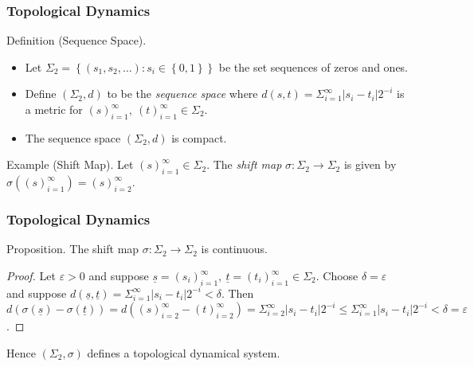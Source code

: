 \documentclass{beamer}
\begin{document}
\begin{frame}
    \frametitle{Topological Dynamics}
    \begin{block}{Definition (Sequence Space).}
        \begin{itemize}
            \item Let $\Sigma_2 = \left\lbrace (s_1, s_2, \dots): s_i \in \left\lbrace 0, 1 \right\rbrace \right\rbrace$ be the set sequences of zeros and ones.
            \item Define $(\Sigma_2, d)$ to be the \emph{sequence space} where $d(s, t) = \Sigma_{i=1}^{\infty}|s_i - t_i|2^{-i}$ is a metric for $(s)_{i=1}^{\infty}, \ (t)_{i=1}^{\infty}  \in \Sigma_2$.
            \item The sequence space $(\Sigma_2, d)$ is compact.
        \end{itemize}
    \end{block}
    \vspace{0.5cm}
    \begin{block}{Example (Shift Map).}
        Let $(s)_{i=1}^{\infty} \in \Sigma_2$. The \emph{shift map} $\sigma: \Sigma_2 \to \Sigma_2$ is given by $\sigma \left((s)_{i=1}^{\infty}\right) = (s)_{i=2}^{\infty}$.
    \end{block}
\end{frame}

\begin{frame}
    \frametitle{Topological Dynamics}
    \begin{block}{Proposition.}
        The shift map $\sigma: \Sigma_2 \to \Sigma_2$ is continuous.
        \begin{proof}
            Let $\varepsilon > 0$ and suppose $\underline{s} = (s_i)_{i=1}^{\infty}, \ \underline{t} = (t_i)_{i=1}^{\infty} \in \Sigma_2$. Choose $\delta = \varepsilon$ and suppose $d(\underline{s}, \underline{t}) = \Sigma_{i=1}^{\infty}|s_i - t_i|2^{-i} < \delta$. Then $d\left( \sigma\left(\underline{s}\right) - \sigma\left(\underline{t}\right) \right) = d\left((s)_{i=2}^{\infty} - (t)_{i=2}^{\infty}\right) = \Sigma_{i=2}^{\infty}|s_i - t_i|2^{-i} \leq \Sigma_{i=1}^{\infty}|s_i - t_i|2^{-i} < \delta = \varepsilon$.
        \end{proof}
    \end{block}
    \vspace{0.5cm}
    Hence $(\Sigma_2, \sigma)$ defines a topological dynamical system.
\end{frame}
\end{document}

